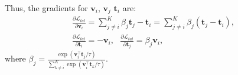 \documentclass[10pt,twocolumn,letterpaper]{article}
\newtheorem{lemma}{Lemma}
\newtheorem{proof}{Proof}
\begin{document}
Thus,  the gradients  for $\boldsymbol{v}_i$, ${\boldsymbol{v}}_j$ $\boldsymbol{t }_i$ are:
\begin{equation}                          
\begin{gathered}
     \frac{\partial \mathcal{L}_{tal}}{\partial\boldsymbol{v}_i} = \sum^K_{j\neq i}\beta_j\boldsymbol{t}_j -\boldsymbol{t}_i  = \sum^K_{j\neq i}\beta_j (\boldsymbol{t}_j-\boldsymbol{t}_i), 
     \\
     \frac{\partial \mathcal{L}_{tal}}{\partial{\boldsymbol{t}}_i} = - \boldsymbol{v}_i,\ \ \   \frac{\partial \mathcal{L}_{tal}}{\partial{\boldsymbol{t}}_j} = \beta_j\boldsymbol{v}_i, 
\end{gathered}
\label{eq_g_tal} 
\end{equation}
where $\beta_j=\frac{\exp( \boldsymbol{v}_i^\top\boldsymbol{t}_j
/\tau)}{\sum^K_{k\neq i}\exp(\boldsymbol{v}_i^\top\boldsymbol{t}_k/\tau)}$.
\end{document}
